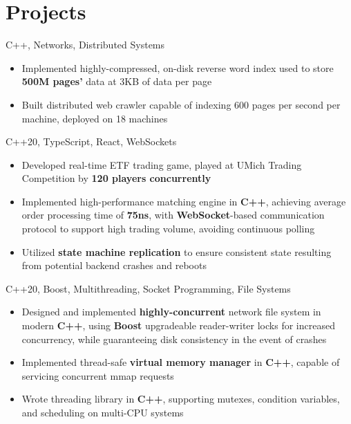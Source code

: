 \documentclass[letterpaper,11pt]{article}
\begin{document}
\section{Projects}
{C++, Networks, Distributed Systems}{}
\begin{itemize}
  \item Implemented highly-compressed, on-disk reverse word index used to store
        \textbf{500M pages'} data at 3KB of data per page
  \item Built distributed web crawler capable of indexing 600 pages per second
        per machine, deployed on 18 machines
\end{itemize}
{C++20, TypeScript, React, WebSockets}{}
\begin{itemize}
  \item Developed real-time ETF trading game, played at UMich Trading Competition
        by \textbf{120 players concurrently}
  \item Implemented high-performance matching engine in \textbf{C++}, achieving average
        order processing time of \textbf{75ns}, with \textbf{WebSocket}-based
        communication protocol to support high
        trading volume, avoiding continuous polling
  \item Utilized \textbf{state machine replication} to ensure consistent state
        resulting from potential backend crashes and reboots
\end{itemize}
{C++20, Boost, Multithreading, Socket Programming, File Systems}{}
\begin{itemize}
  \item Designed and implemented \textbf{highly-concurrent} network file system in modern
        \textbf{C++}, using \textbf{Boost} upgradeable reader-writer locks for
        increased concurrency, while guaranteeing disk consistency in the event
        of crashes
\end{itemize}
\begin{itemize}
  \item Implemented thread-safe \textbf{virtual memory manager} in
        \textbf{C++}, capable of servicing concurrent mmap requests
  \item Wrote threading library in \textbf{C++}, supporting
        mutexes, condition variables, and scheduling on multi-CPU systems
\end{itemize}
\end{document}
